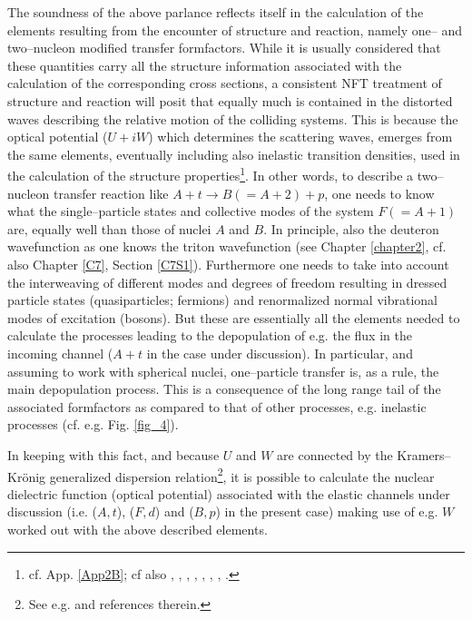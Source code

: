 The soundness of the above parlance  reflects itself in the calculation of the elements resulting from the encounter of structure and reaction, namely one-- and two--nucleon modified transfer formfactors. While it is usually considered that these quantities carry all the structure information associated with the calculation of the corresponding cross sections, a consistent NFT treatment of structure and reaction will posit that equally much is contained in the distorted waves describing the relative motion of the colliding systems. This is because the optical potential ($U+iW$) which determines the scattering waves, emerges from the same elements, eventually including also inelastic transition densities, used in the calculation of the structure properties\footnote{cf. App. \ref{App2B}; cf also \cite{Broglia:81b}, \cite{Pollarolo:83}, \cite{Broglia:04a}, \cite{Fernandez:10}, \cite{Fernandez:10b}, \cite{Dickhoff:05}, \cite{Jenning:11}, \cite{Montanari:14}.}. In other words, to describe a two--nucleon transfer reaction like $A+t\rightarrow B(=A+2)+p$, one needs to know what the single--particle states and collective modes of the system $F(=A+1)$ are, equally well than those of nuclei $A$ and $B$. In principle, also  the deuteron wavefunction as one knows the triton wavefunction (see Chapter \ref{chapter2}, cf. also Chapter \ref{C7}, Section \ref{C7S1}). Furthermore one needs to take into account the interweaving of different modes and degrees of freedom resulting in   dressed particle states (quasiparticles; fermions) and renormalized normal vibrational modes of excitation (bosons). But these are essentially all the elements needed to calculate the processes leading to the depopulation of e.g. the flux in the incoming channel ($A+t$ in the case under discussion). In particular, and assuming to work with spherical nuclei, one--particle transfer is, as a rule, the main depopulation process. This is a consequence of the long range tail of the associated formfactors as compared to that of other processes, e.g. inelastic processes (cf. e.g. Fig. \ref{fig_4}).


In keeping with this fact, and because $U$ and $W$ are connected by the Kramers--Kr\"onig generalized dispersion relation\footnote{See e.g. \cite{Mahaux:85} and references therein.}, it is possible to calculate the nuclear dielectric function (optical potential) associated with the elastic channels under discussion (i.e. ($A,t$), ($F,d$) and ($B,p$) in the present case) making use of e.g. $W$ worked out with the above described elements.

